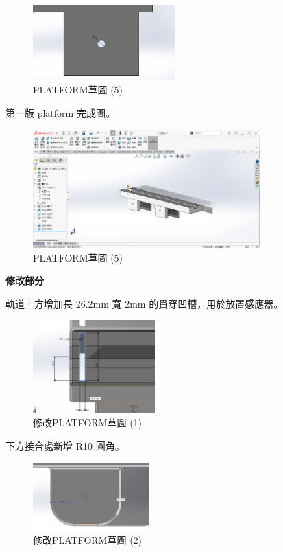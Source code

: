  \begin{figure}[htbp]
        \centering
        \includegraphics[width=0.49\textwidth]{./../images/6-1-18}
        \caption{PLATFORM草圖 (5)}
    \end{figure}

\newpage

第一版 platform 完成圖。

\begin{figure}[htbp]
    \centering
    \includegraphics[width=0.78\textwidth]{./../images/6-1-19}
    \caption{PLATFORM草圖 (5)}
\end{figure}

\textbf{修改部分}

軌道上方增加長 26.2mm 寬 2mm 的貫穿凹槽，用於放置感應器。

\begin{figure}[htbp]
    \centering
    \includegraphics[width=0.42\textwidth]{./../images/6-1-20}
    \caption{修改PLATFORM草圖 (1)}
\end{figure}


下方接合處新增 R10 圓角。

\begin{figure}[htbp]
    \centering
    \includegraphics[width=0.4\textwidth]{./../images/6-1-21}
    \caption{修改PLATFORM草圖 (2)}
\end{figure}

